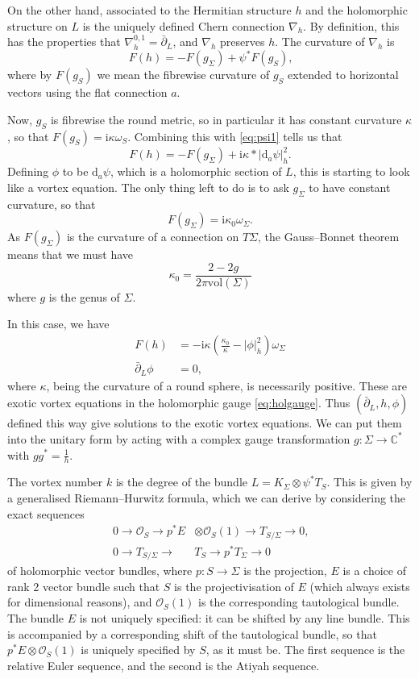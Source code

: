 \documentclass[10pt]{article}
\newcommand{\mc}[1]{\mathcal{#1}}
\newcommand{\ii}{\text{i}}
\newcommand{\dd}{\textrm{d}}
\newcommand{\db}{\bar{\partial}}
\theoremstyle{definition}
\begin{document}
On the other hand, associated to the Hermitian structure \(h\) and the holomorphic structure on \(L\) is the uniquely defined Chern connection \(\nabla_h\). By definition, this has the properties that \(\nabla_h^{0,1} = \db_L\), and \(\nabla_h\) preserves \(h\). The curvature of \(\nabla_h\) is
\[
F(h) = - F(g_\Sigma) + \psi^*F(g_S) \text{,}
\]
where by \(F(g_S)\) we mean the fibrewise curvature of \(g_S\) extended to horizontal vectors using the flat connection \(a\).

Now, \(g_S\) is fibrewise the round metric, so in particular it has constant curvature \(\kappa\), so that \(F(g_S) = \ii \kappa \omega_S\). Combining this with \eqref{eq:psi1} tells us that
\[
F(h) = - F(g_\Sigma) + \ii \kappa * | \dd_a \psi|_h^2 \text{.}
\]
Defining \(\phi\) to be \(\dd_a \psi\), which is a holomorphic section of \(L\), this is starting to look like a vortex equation. The only thing left to do is to ask \(g_\Sigma\) to have constant curvature, so that
\[
F(g_\Sigma) = \ii \kappa_0 \omega_\Sigma \text{.}
\]
As \(F(g_\Sigma)\) is the curvature of a connection on \(T\Sigma\), the Gauss--Bonnet theorem means that we must have
\[
\kappa_0 = \frac{2-2g}{2\pi \text{vol}(\Sigma)}
\]
where \(g\) is the genus of \(\Sigma\).

In this case, we have
\begin{align*}
F(h) &= - \ii \kappa \left( \frac{\kappa_0}{\kappa} -  | \phi|_h^2 \right) \omega_\Sigma \\
\db_L \phi	&= 0 \text{,} 
\end{align*}
where \(\kappa\), being the curvature of a round sphere, is necessarily positive. These are exotic vortex equations in the holomorphic gauge \eqref{eq:holgauge}. Thus \((\db_L, h, \phi)\) defined this way give solutions to the exotic vortex equations. We can put them into the unitary form by acting with a complex gauge transformation \(g: \Sigma \to \mathbb{C}^*\) with \(gg^* = \frac{1}{h}\). 

The vortex number \(k\) is the degree of the bundle \(L = K_\Sigma \otimes \psi^*T_S\). This is given by a generalised Riemann--Hurwitz formula, which we can derive by considering the exact sequences
\begin{align*}
0 \to \mc{O}_S \to p^*E &\otimes \mc{O}_S(1) \to T_{S/\Sigma} \to 0\text{,} \\
0 \to T_{S/\Sigma} \to &T_S \to p^*T_\Sigma \to 0
\end{align*}
of holomorphic vector bundles, where \(p : S \to \Sigma\) is the projection, \(E\) is a choice of rank 2 vector bundle such that \(S\) is the projectivisation of \(E\) (which always exists for dimensional reasons), and \(\mc{O}_S(1)\) is the corresponding tautological bundle.
The bundle \(E\) is not uniquely specified: it can be shifted by any line bundle. This is accompanied by a corresponding shift of the tautological bundle, so that \(p^*E \otimes \mc{O}_S(1)\) is uniquely specified by \(S\), as it must be. The first sequence is the relative Euler sequence, and the second is the Atiyah sequence.
\end{document}
